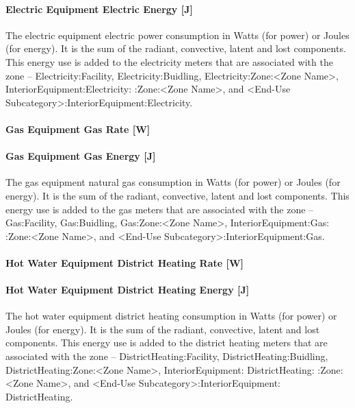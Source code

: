 \paragraph{Electric Equipment Electric Energy {[}J{]}}\label{electric-equipment-electric-energy-j}

The electric equipment electric power consumption in Watts (for power) or Joules (for energy). It is the sum of the radiant, convective, latent and lost components. This energy use is added to the electricity meters that are associated with the zone -- Electricity:Facility, Electricity:Buidling, Electricity:Zone:\textless{}Zone Name\textgreater{}, InteriorEquipment:Electricity: :Zone:\textless{}Zone Name\textgreater{}, and \textless{}End-Use Subcategory\textgreater{}:InteriorEquipment:Electricity.

\paragraph{Gas Equipment Gas Rate {[}W{]}}\label{gas-equipment-gas-rate-w}

\paragraph{Gas Equipment Gas Energy {[}J{]}}\label{gas-equipment-gas-energy-j}

The gas equipment natural gas consumption in Watts (for power) or Joules (for energy). It is the sum of the radiant, convective, latent and lost components. This energy use is added to the gas meters that are associated with the zone -- Gas:Facility, Gas:Buidling, Gas:Zone:\textless{}Zone Name\textgreater{}, InteriorEquipment:Gas: :Zone:\textless{}Zone Name\textgreater{}, and \textless{}End-Use Subcategory\textgreater{}:InteriorEquipment:Gas.

\paragraph{Hot Water Equipment District Heating Rate {[}W{]}}\label{hot-water-equipment-district-heating-rate-w}

\paragraph{Hot Water Equipment District Heating Energy {[}J{]}}\label{hot-water-equipment-district-heating-energy-j}

The hot water equipment district heating consumption in Watts (for power) or Joules (for energy). It is the sum of the radiant, convective, latent and lost components. This energy use is added to the district heating meters that are associated with the zone -- DistrictHeating:Facility, DistrictHeating:Buidling, DistrictHeating:Zone:\textless{}Zone Name\textgreater{}, InteriorEquipment: DistrictHeating: :Zone:\textless{}Zone Name\textgreater{}, and \textless{}End-Use Subcategory\textgreater{}:InteriorEquipment: DistrictHeating.


